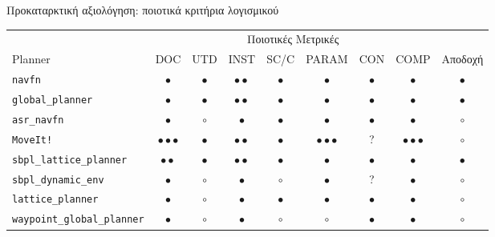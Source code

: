 \begin{frame}{Προκαταρκτική αξιολόγηση: ποιοτικά κριτήρια λογισμικού}

{\footnotesize
\begin{table}[h]%
\begin{tabular}{lccccccc|c}
  & \multicolumn{7}{c}{Ποιοτικές Μετρικές} \\
  \cline{2-8}
  Planner                              & DOC                       & UTD         & INST              & SC/C      & PARAM                   & CON              & COMP                    & Αποδοχή      \\ \toprule
  \texttt{navfn}                       & $\bullet$                 & $\bullet$   & $\bullet\bullet$  & $\bullet$ & $\bullet$               & $\bullet$        & $\bullet$               & $\bullet$    \\
  \texttt{global\_planner}             & $\bullet$                 & $\bullet$   & $\bullet\bullet$  & $\bullet$ & $\bullet$               & $\bullet$        & $\bullet$               & $\bullet$    \\
  \texttt{asr\_navfn}                  & $\bullet$                 & $\circ$     & $\bullet$         & $\bullet$ & $\bullet$               & $\bullet$        & $\bullet$               & $\circ$      \\
  \texttt{MoveIt!}                     & $\bullet\bullet\bullet$   & $\bullet$   & $\bullet\bullet$  & $\bullet$ & $\bullet\bullet\bullet$ & ?                & $\bullet\bullet\bullet$ & $\circ$      \\
  \texttt{sbpl\_lattice\_planner}      & $\bullet\bullet$          & $\bullet$   & $\bullet\bullet$  & $\bullet$ & $\bullet$               & $\bullet$ & $\bullet$               & $\bullet$    \\
  \texttt{sbpl\_dynamic\_env}          & $\bullet$                 & $\circ$     & $\bullet$         & $\circ$   & $\bullet$               & ?                & $\bullet$               & $\circ$      \\
  \texttt{lattice\_planner}            & $\bullet$                 & $\circ$     & $\bullet$         & $\bullet$ & $\bullet$               & $\bullet$        & $\bullet$               & $\circ$      \\
  \texttt{waypoint\_global\_planner}   & $\bullet$                 & $\circ$     & $\bullet$         & $\circ$   & $\circ$                 & $\bullet$        & $\bullet$               & $\circ$      \\

\end{tabular}
\end{table}}
\end{frame}
